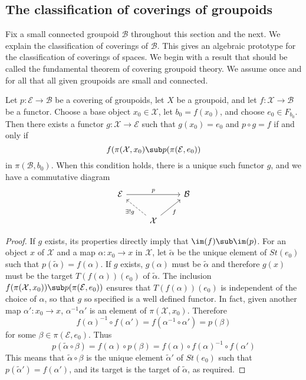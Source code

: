 \subsection{The classification of coverings of groupoids}
Fix a small connected groupoid $\mathcal{B}$ throughout this section and the next. We explain the classification of coverings of $\mathcal{B}$. This gives an algebraic prototype for the classification of coverings of spaces. We begin with a result that should be called the fundamental theorem of covering groupoid theory. We assume once and for all that all given groupoids are small and connected.
\begin{theorem}
Let $p:\mathcal{E}\to\mathcal{B}$ be a covering of groupoids, let $X$ be a groupoid, and let $f:\mathcal{X}\to\mathcal{B}$ be a functor. Choose a base object $x_0\in\mathcal{X}$, let $b_0=f(x_0)$, and choose $e_0\in F_{b_0}$. Then there exists a functor $g:\mathcal{X}\to\mathcal{E}$ such that $g(x_0)=e_0$
and $p\circ g=f$ if and only if
\[f(\pi(\mathcal{X},x_0)\sub p(\pi(\mathcal{E},e_0))\]
in $\pi(\mathcal{B},b_0)$. When this condition holds, there is a unique such functor $g$, and we have a commutative diagram
\[\begin{tikzcd}
\mathcal{E}\ar[rr,"p"]&&\mathcal{B}\\
&\mathcal{X}\ar[lu,dashed,"\exists!g"]\ar[ru,swap,"f"]&
\end{tikzcd}\]
\end{theorem}
\begin{proof}
If $g$ exists, its properties directly imply that $\im(f)\sub\im(p)$. For an
object $x$ of $\mathcal{X}$ and a map $\alpha:x_0\to x$ in $\mathcal{X}$, let $\widetilde{\alpha}$ be the unique element of $St(e_0)$ such that $p(\widetilde{\alpha})=f(\alpha)$. If $g$ exists, $g(\alpha)$ must be $\widetilde{\alpha}$ and therefore $g(x)$ must be the target $T(f(\alpha))(e_0)$ of $\widetilde{\alpha}$. The inclusion $f(\pi(\mathcal{X},x_0))\sub p(\pi(\mathcal{E},e_0))$ ensures that $T(f(\alpha))(e_0)$ is independent of the choice of $\alpha$, so that $g$ so specified is a well defined functor. In fact, given another map $\alpha':x_0\to x$, $\alpha^{-1}\alpha'$ is an element of $\pi(\mathcal{X},x_0)$. Therefore
\[f(\alpha)^{-1}\circ f(\alpha')=f(\alpha^{-1}\circ\alpha')=p(\beta)\]
for some $\beta\in\pi(\mathcal{E},e_0)$. Thus
\[p(\widetilde{\alpha}\circ\beta)=f(\alpha)\circ p(\beta)=f(\alpha)\circ f(\alpha)^{-1}\circ f(\alpha')\]
This means that $\widetilde{\alpha}\circ\beta$ is the unique element $\widetilde{\alpha}'$ of $St(e_0)$ such that $p(\widetilde{\alpha}')=f(\alpha')$, and its target is the target of $\widetilde{\alpha}$, as required.
\end{proof}

